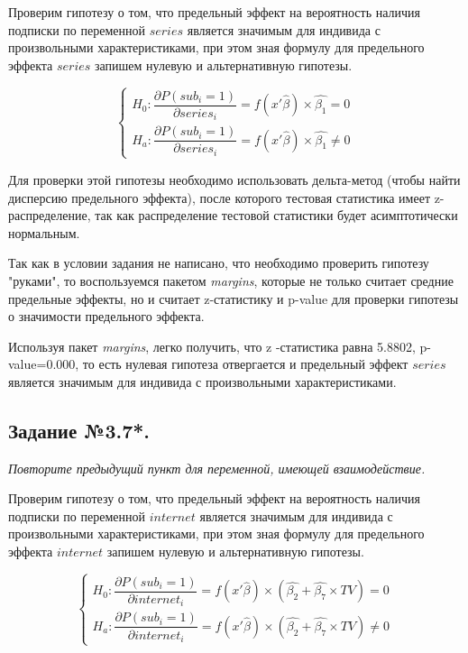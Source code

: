 \documentclass[a4paper,12pt]{article}
\begin{document}
	\vspace{0.2cm}
	
	Проверим гипотезу о том, что предельный эффект на вероятность наличия подписки по переменной $series$ является значимым для индивида с произвольными характеристиками, при этом зная формулу для предельного эффекта $series$ запишем нулевую и альтернативную гипотезы.
	
	\begin{equation*}
		\begin{cases}
			H_0: \dfrac{\partial P(sub_i=1)}{\partial series_i}=f(x'\hat{\beta})\times\hat{\beta_1} = 0\\[0.3cm]
			H_a: \dfrac{\partial P(sub_i=1)}{\partial series_i}=f(x'\hat{\beta})\times\hat{\beta_1} \ne 0
		\end{cases}
	\end{equation*}
	
	Для проверки этой гипотезы необходимо использовать дельта-метод (чтобы найти дисперсию предельного эффекта), после которого тестовая статистика имеет z-распределение, так как распределение тестовой статистики будет асимптотически нормальным.
	
	Так как в условии задания не написано, что необходимо проверить гипотезу "руками", то воспользуемся пакетом \textit{margins}, которые не только считает средние предельные эффекты, но и считает z-статистику и p-value для проверки гипотезы о значимости предельного эффекта.
	
	Используя пакет \textit{margins}, легко получить, что z -статистика равна 5.8802, p-value=0.000, то есть нулевая гипотеза отвергается и предельный эффект $series$ является значимым для индивида с произвольными характеристиками.
	
	\subsection{Задание №3.7*.}
	\textit{
	Повторите предыдущий пункт для переменной, имеющей взаимодействие.}
	
	\vspace{0.2cm}
	
	Проверим гипотезу о том, что предельный эффект на вероятность наличия подписки по переменной $internet$ является значимым для индивида с произвольными характеристиками, при этом зная формулу для предельного эффекта $internet$ запишем нулевую и альтернативную гипотезы.
	
	\begin{equation*}
		\begin{cases}
			H_0: \dfrac{\partial P(sub_i=1)}{\partial internet_i}=f(x'\hat{\beta})\times(\hat{\beta_2}+\hat{\beta_7}\times TV) = 0\\[0.3cm]
			H_a: \dfrac{\partial P(sub_i=1)}{\partial internet_i}=f(x'\hat{\beta})\times(\hat{\beta_2}+\hat{\beta_7}\times TV) \ne 0
		\end{cases}
	\end{equation*}
	
\end{document}
